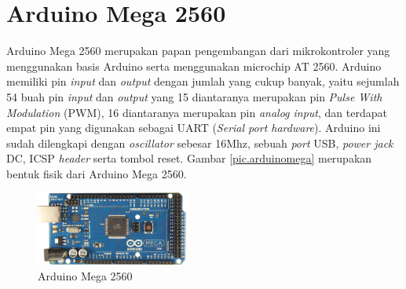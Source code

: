 \section{Arduino Mega 2560}
Arduino Mega 2560  merupakan papan pengembangan dari mikrokontroler yang menggunakan basis Arduino serta menggunakan microchip AT 2560. Arduino  memiliki pin \textit{input} dan \textit{output} dengan jumlah yang cukup banyak, yaitu sejumlah 54 buah pin \textit{input} dan \textit{output} yang 15 diantaranya merupakan pin \textit{Pulse With Modulation} (PWM), 16 diantaranya merupakan pin \textit{analog input}, dan terdapat empat pin yang digunakan sebagai UART (\textit{Serial port hardware}). Arduino ini sudah dilengkapi dengan \textit{oscillator} sebesar 16Mhz, sebuah \textit{port} USB, \textit{power jack} DC, ICSP \textit{header} serta tombol reset. Gambar \ref{pic.arduinomega} merupakan bentuk fisik dari Arduino Mega 2560.
	\begin{figure}[H]
	\centering
	\includegraphics[width=5cm]{gambar/arduino_mega.jpg}
	\caption{Arduino Mega 2560}
	\label{pic.arudinomega}
	\end{figure}


